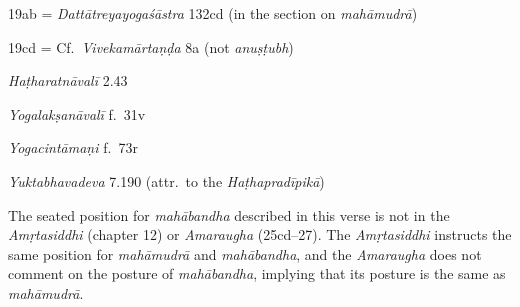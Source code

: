 \begin{ekdosis}
\begin{sources}[hp03_019]
19ab = \emph{Dattātreyayogaśāstra} 132cd (in the section on \emph{mahāmudrā})
\begin{versinnote}
\end{versinnote}

19cd = Cf.~\emph{Vivekamārtaṇḍa} 8a (not \emph{anuṣṭubh})
\begin{versinnote}
\end{versinnote}
\end{sources}

\begin{testimonia}[hp03_019]
\emph{Haṭharatnāvalī} 2.43
\begin{versinnote}
\end{versinnote}

\emph{Yogalakṣanāvalī} f.~31v
\begin{versinnote}
\end{versinnote}

\emph{Yogacintāmaṇi} f.~73r
\begin{versinnote}
\end{versinnote}

\emph{Yuktabhavadeva} 7.190 (attr.~to the \emph{Haṭhapradīpikā})
\begin{versinnote}
\end{versinnote}
\end{testimonia}

\begin{philcomm}[hp03_019]
The seated position for \emph{mahābandha} described in this verse is not in the \emph{Amṛtasiddhi} (chapter 12) or \emph{Amaraugha} (25cd–27). The \emph{Amṛtasiddhi} instructs the same position for \emph{mahāmudrā} and \emph{mahābandha}, and the \emph{Amaraugha} does not comment on the posture of \emph{mahābandha}, implying that its posture is the same as \emph{mahāmudrā}.
\end{philcomm}


\end{ekdosis}
